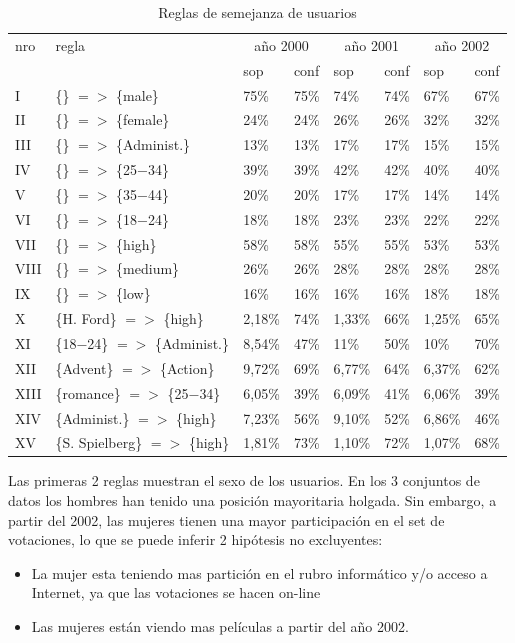 \documentclass[journal]{IEEEtran}
\begin{document}
\begin{table}[ht!]
\caption{Reglas de semejanza de usuarios}
\label{comparacion}
\centering
\begin{tabular}{|l l ||l l|l l|l l|}
	\hline
	nro & regla & 
	\multicolumn{2}{c|}{año 2000} & 
	\multicolumn{2}{c|}{año 2001} & 
	\multicolumn{2}{c|}{año 2002} \\
	     &  & sop & conf & sop & conf & sop & conf \\
	I    & \{\} $=$$>$ \{male\} & 75\% & 75\% & 74\% & 74\% & 67\% & 67\% \\
	II   & \{\} $=$$>$ \{female\} & 24\% & 24\% & 26\% & 26\% & 32\% & 32\% \\
	III  & \{\} $=$$>$ \{Administ.\} & 13\% & 13\% & 17\% & 17\% & 15\% & 15\% \\
	IV   & \{\} $=$$>$ \{25$-$34\} & 39\% & 39\% & 42\% & 42\% & 40\% & 40\% \\
	V    & \{\} $=$$>$ \{35$-$44\} & 20\% & 20\% & 17\% & 17\% & 14\% & 14\% \\
	VI   & \{\} $=$$>$ \{18$-$24\} & 18\% & 18\% & 23\% & 23\% & 22\% & 22\% \\
	VII  & \{\} $=$$>$ \{high\} & 58\% & 58\% & 55\% & 55\% & 53\% & 53\% \\
	VIII & \{\} $=$$>$ \{medium\} & 26\% & 26\% & 28\% & 28\% & 28\% & 28\% \\
	IX   & \{\} $=$$>$ \{low\} & 16\% & 16\% & 16\% & 16\% & 18\% & 18\% \\
	X    & \{H. Ford\} $=$$>$ \{high\} & 2,18\% & 74\% & 1,33\% & 66\% & 1,25\% & 65\% \\
	XI  & \{18$-$24\} $=$$>$ \{Administ.\} & 8,54\% & 47\% & 11\% & 50\% & 10\% & 70\% \\
	XII & \{Advent\} $=$$>$ \{Action\} & 9,72\% & 69\% & 6,77\% & 64\% & 6,37\% & 62\% \\
	XIII  & \{romance\} $=$$>$ \{25$-$34\} & 6,05\% & 39\% & 6,09\% & 41\% & 6,06\% & 39\% \\
	XIV   & \{Administ.\} $=$$>$ \{high\} & 7,23\% & 56\% & 9,10\% & 52\% & 6,86\% & 46\% \\
	XV  & \{S. Spielberg\} $=$$>$ \{high\} & 1,81\% & 73\% & 1,10\% & 72\% & 1,07\% & 68\% \\
	\hline
\end{tabular}
\end{table}

Las primeras 2 reglas muestran el sexo de los usuarios. 
En los 3 conjuntos de datos los hombres han tenido una posición mayoritaria holgada. 
Sin embargo, a partir del 2002, las mujeres tienen una
mayor participación en el set de votaciones, lo que se puede inferir 2 hipótesis
no excluyentes:
\begin{itemize}
\item La mujer esta teniendo mas partición en el rubro informático y/o acceso a Internet, ya que las 
votaciones se hacen on-line
\item Las mujeres están viendo mas películas a partir del año 2002.
\end{itemize}
\end{document}
